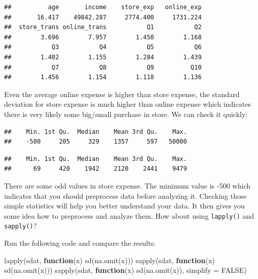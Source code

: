 \documentclass[
  12pt,
]{krantz}
\makeatletter
\newenvironment{Shaded}{\begin{snugshade}}{\end{snugshade}}
\newcommand{\AttributeTok}[1]{\textcolor[rgb]{0.61,0.61,0.61}{#1}}
\newcommand{\ConstantTok}[1]{\textcolor[rgb]{0,0,0}{#1}}
\newcommand{\ControlFlowTok}[1]{\textcolor[rgb]{0.27,0.27,0.27}{\textbf{#1}}}
\newcommand{\FunctionTok}[1]{\textcolor[rgb]{0,0,0}{#1}}
\newcommand{\NormalTok}[1]{#1}
\newcommand{\SpecialCharTok}[1]{\textcolor[rgb]{0,0,0}{#1}}
\newenvironment{kframe}{%
\medskip{}
\setlength{\fboxsep}{.8em}
 \def\at@end@of@kframe{}%
 \ifinner\ifhmode%
  \def\at@end@of@kframe{\end{minipage}}%
  \begin{minipage}{\columnwidth}%
 \fi\fi%
 \def\FrameCommand##1{\hskip\@totalleftmargin \hskip-\fboxsep
 \colorbox{shadecolor}{##1}\hskip-\fboxsep
     \hskip-\linewidth \hskip-\@totalleftmargin \hskip\columnwidth}%
 \MakeFramed {\advance\hsize-\width
   \@totalleftmargin\z@ \linewidth\hsize
   \@setminipage}}%
 {\par\unskip\endMakeFramed%
 \at@end@of@kframe}
\renewenvironment{Shaded}{\begin{kframe}}{\end{kframe}}
\makeatother
\begin{document}
\begin{verbatim}
##          age       income    store_exp   online_exp 
##       16.417    49842.287     2774.400     1731.224 
##  store_trans online_trans           Q1           Q2 
##        3.696        7.957        1.450        1.168 
##           Q3           Q4           Q5           Q6 
##        1.402        1.155        1.284        1.439 
##           Q7           Q8           Q9          Q10 
##        1.456        1.154        1.118        1.136
\end{verbatim}

Even the average online expense is higher than store expense, the standard deviation for store expense is much higher than online expense which indicates there is very likely some big/small purchase in store. We can check it quickly:

\begin{Shaded}
\end{Shaded}

\begin{verbatim}
##    Min. 1st Qu.  Median    Mean 3rd Qu.    Max. 
##    -500     205     329    1357     597   50000
\end{verbatim}

\begin{Shaded}
\end{Shaded}

\begin{verbatim}
##    Min. 1st Qu.  Median    Mean 3rd Qu.    Max. 
##      69     420    1942    2120    2441    9479
\end{verbatim}

There are some odd values in store expense. The minimum value is -500 which indicates that you should preprocess data before analyzing it. Checking those simple statistics will help you better understand your data. It then gives you some idea how to preprocess and analyze them. How about using \texttt{lapply()} and \texttt{sapply()}?

Run the following code and compare the results:

\begin{Shaded}
\begin{Highlighting}[]
\FunctionTok{lapply}\NormalTok{(sdat, }\ControlFlowTok{function}\NormalTok{(x) }\FunctionTok{sd}\NormalTok{(}\FunctionTok{na.omit}\NormalTok{(x)))}
\FunctionTok{sapply}\NormalTok{(sdat, }\ControlFlowTok{function}\NormalTok{(x) }\FunctionTok{sd}\NormalTok{(}\FunctionTok{na.omit}\NormalTok{(x)))}
\FunctionTok{sapply}\NormalTok{(sdat, }\ControlFlowTok{function}\NormalTok{(x) }\FunctionTok{sd}\NormalTok{(}\FunctionTok{na.omit}\NormalTok{(x)), }\AttributeTok{simplify =} \ConstantTok{FALSE}\NormalTok{)}
\end{Highlighting}
\end{Shaded}
\end{document}
